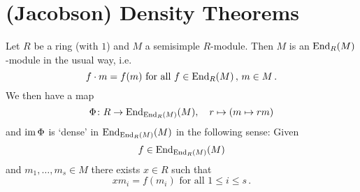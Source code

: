 \section{(Jacobson) Density Theorems}


\begin{theorem}
  Let $R$ be a ring (with $1$) and $M$ a semisimple $R$-module.
  Then $M$ is an $\operatorname{End}_R(M)$-module in the usual way, i.e.\
  \[
      f \cdot m
    = f(m)
    \text{ for all }
    f \in \operatorname{End}_R(M)\,,\,
    m \in M \,.
  \]
  We then have a map
  \[
            \Phi
    \colon  R
    \to     \operatorname{End}_{\operatorname{End}_R(M)}(M),
    \quad   r
    \mapsto (m \mapsto rm)
  \]
  and $\operatorname{im} \Phi$ is `dense' in $\operatorname{End}_{\operatorname{End}_R(M)}(M)$ in the following sense:
  Given
  \[
    f \in \operatorname{End}_{\operatorname{End}_R(M)}(M)
  \]
  and $m_1, \dotsc, m_s \in M$ there exists $x \in R$ such that
  \[
      x m_i
    = f(m_i)
    \text{ for all }
    1 \leq i \leq s \,.
  \]
\end{theorem}
